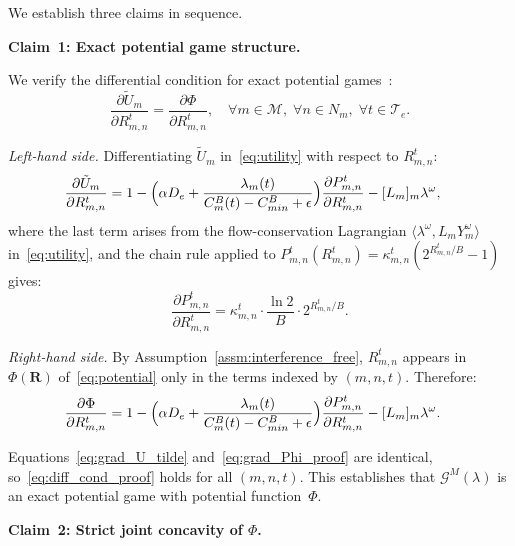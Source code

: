 \documentclass[journal]{IEEEtran}
\newcommand{\CB}{C^{B}}
\newcommand{\CBmin}{C^{B}_{min}}
\newcommand{\calM}{\mathcal{M}}
\newcommand{\calG}{\mathcal{G}}
\newcommand{\calT}{\mathcal{T}}
\newcommand{\bfR}{\mathbf{R}}
\newcommand{\Rmn}{R_{m,n}^{t}}
\begin{document}
\begin{IEEEproof}
We establish three claims in sequence.

\smallskip
\noindent\textbf{Claim~1: Exact potential game structure.}

We verify the differential condition for exact potential games~\cite{monderer1996potential}:
\begin{equation}
    \frac{\partial \tilde{U}_m}{\partial \Rmn}
    = \frac{\partial \Phi}{\partial \Rmn},
    \quad \forall m\in\calM,\;
    \forall n\in N_m,\;
    \forall t\in\calT_e.
    \label{eq:diff_cond_proof}
\end{equation}

\noindent\emph{Left-hand side.}
Differentiating $\tilde{U}_m$ in~\eqref{eq:utility} with respect to $\Rmn$:
\begin{align}
    \frac{\partial \tilde{U}_m}{\partial \Rmn}
    &= 1
    - \Bigl(\alpha D_e
    + \frac{\lambda_m(t)}%
    {\CB_m(t)-\CBmin+\epsilon}\Bigr)
    \frac{\partial P_{m,n}^t}{\partial \Rmn}
    - [L_m]_m \lambda^\omega,
    \label{eq:grad_U_tilde}
\end{align}
where the last term arises from the flow-conservation Lagrangian $\langle\lambda^\omega, L_m Y_m^\omega\rangle$ in~\eqref{eq:utility}, and the chain rule applied to $P_{m,n}^t(R_{m,n}^t) = \kappa_{m,n}^t(2^{R_{m,n}^t/B}-1)$ gives:
\begin{equation}
    \frac{\partial P_{m,n}^t}{\partial \Rmn}
    = \kappa_{m,n}^t \cdot \frac{\ln 2}{B}
    \cdot 2^{\Rmn/B}.
    \label{eq:dp_dr_proof}
\end{equation}

\noindent\emph{Right-hand side.}
By Assumption~\ref{assm:interference_free}, $\Rmn$ appears in $\Phi(\bfR)$ of~\eqref{eq:potential} only in the terms indexed by $(m,n,t)$. Therefore:
\begin{align}
    \frac{\partial \Phi}{\partial \Rmn}
    &= 1
    - \Bigl(\alpha D_e
    + \frac{\lambda_m(t)}%
    {\CB_m(t)-\CBmin+\epsilon}\Bigr)
    \frac{\partial P_{m,n}^t}{\partial \Rmn}
    - [L_m]_m \lambda^\omega.
    \label{eq:grad_Phi_proof}
\end{align}

Equations~\eqref{eq:grad_U_tilde} and~\eqref{eq:grad_Phi_proof} are identical, so~\eqref{eq:diff_cond_proof} holds for all $(m,n,t)$. This establishes that $\calG^M(\lambda)$ is an exact potential game with potential function~$\Phi$.

\smallskip
\noindent\textbf{Claim~2: Strict joint concavity
of $\Phi$.}


\end{IEEEproof}
\end{document}
